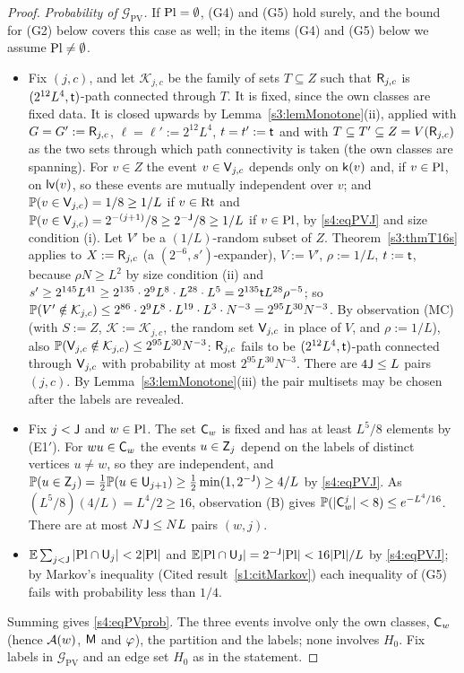 \begin{proof}
\emph{Probability of $\mathcal G_{\mathrm{PV}}$.} If $\mathrm{Pl}=\emptyset$, (G4) and (G5) hold surely, and the bound for (G2)
below covers this case as well; in the items (G4) and (G5) below we assume $\mathrm{Pl}\ne\emptyset$.
\begin{itemize}
\item[(G2)] Fix $(j,c)$, and let $\mathcal K_{j,c}$ be the family of sets $T\subseteq Z$ such that $\mathsf{R}_{j,c}$ is
  $(2^{12}L^4,\mathsf{t})$-path connected through $T$. It is fixed, since the own classes are fixed data. It is closed
  upwards by Lemma~\ref{s3:lemMonotone}(ii), applied with $G=G':=\mathsf{R}_{j,c}$, $\ell=\ell':=2^{12}L^4$, $t=t':=\mathsf{t}$ and
  with $T\subseteq T'\subseteq Z=V(\mathsf{R}_{j,c})$ as the two sets through which path connectivity is taken (the own
  classes are spanning). For $v\in Z$ the event $v\in\mathsf{V}_{j,c}$ depends only on $\mathsf{k}(v)$ and, if $v\in\mathrm{Pl}$, on
  $\mathsf{lv}(v)$, so these events are mutually independent over $v$; and $\mathbb{P}(v\in\mathsf{V}_{j,c})=1/8\ge1/L$ if $v\in\mathrm{Rt}$
  and $\mathbb{P}(v\in\mathsf{V}_{j,c})=2^{-(j+1)}/8\ge2^{-\mathsf{J}}/8\ge1/L$ if $v\in\mathrm{Pl}$, by \eqref{s4:eqPVJ} and size condition
  (i). Let $V'$ be a $(1/L)$-random subset of $Z$.
  Theorem~\ref{s3:thmT16s} applies to $X:=\mathsf{R}_{j,c}$ (a $(2^{-6},s')$-expander), $V:=V'$, $\rho:=1/L$, $t:=\mathsf{t}$,
  because $\rho N\ge L^2$ by size condition (ii) and $s'\ge2^{145}L^{41}\ge2^{135}\cdot2^9L^8\cdot L^{28}\cdot
  L^5=2^{135}\mathsf{t} L^{28}\rho^{-5}$; so
  $\mathbb{P}(V'\notin\mathcal K_{j,c})\le2^{86}\cdot2^9L^8\cdot L^{19}\cdot L^3\cdot N^{-3}=2^{95}L^{30}N^{-3}$. By
  observation \textup{(MC)} (with $S:=Z$, $\mathcal K:=\mathcal K_{j,c}$, the random set $\mathsf{V}_{j,c}$ in place of $V$,
  and $\rho:=1/L$), also $\mathbb{P}(\mathsf{V}_{j,c}\notin\mathcal K_{j,c})\le2^{95}L^{30}N^{-3}$: $\mathsf{R}_{j,c}$ fails to be
  $(2^{12}L^4,\mathsf{t})$-path connected through $\mathsf{V}_{j,c}$ with probability at most $2^{95}L^{30}N^{-3}$. There are
  $4\mathsf{J}\le L$ pairs $(j,c)$. By Lemma~\ref{s3:lemMonotone}(iii) the pair multisets may be chosen after the labels
  are revealed.
\item[(G4)] Fix $j<\mathsf{J}$ and $w\in\mathrm{Pl}$. The set $\mathsf{C}_w$ is fixed and has at least $L^5/8$ elements by (E1$'$). For
  $wu\in\mathsf{C}_w$ the events $u\in\mathsf{Z}_j$ depend on the labels of distinct vertices $u\ne w$, so they are independent,
  and $\mathbb{P}(u\in\mathsf{Z}_j)=\frac12\mathbb{P}(u\in\mathsf{U}_{j+1})\ge\frac12\min(1,2^{-\mathsf{J}})\ge4/L$ by \eqref{s4:eqPVJ}. As
  $(L^5/8)(4/L)=L^4/2\ge16$, observation \textup{(B)} gives $\mathbb{P}(|\mathsf{C}^j_w|<8)\le e^{-L^4/16}$. There are at most
  $N\mathsf{J}\le NL$ pairs $(w,j)$.
\item[(G5)] $\mathbb{E}\sum_{j<\mathsf{J}}|\mathrm{Pl}\cap\mathsf{U}_j|<2|\mathrm{Pl}|$ and $\mathbb{E}|\mathrm{Pl}\cap\mathsf{U}_{\mathsf{J}}|=2^{-\mathsf{J}}|\mathrm{Pl}|<16|\mathrm{Pl}|/L$ by
  \eqref{s4:eqPVJ}; by Markov's inequality (Cited result~\ref{s1:citMarkov}) each inequality of (G5) fails with
  probability less than $1/4$.
\end{itemize}
Summing gives \eqref{s4:eqPVprob}. The three events involve only the own classes, $\mathsf{C}_w$ (hence $\mathcal{A}(w)$, $\mathsf{M}$
and $\varphi$), the partition and the labels; none involves $H_0$. Fix labels in $\mathcal G_{\mathrm{PV}}$ and an edge
set $H_0$ as in the statement.


\end{proof}
